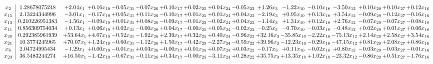 \documentclass[9pt]{article}
\begin{document}
 \[\begin{array}{c| c c@{\hskip 2pt} c@{\hskip 2pt} c@{\hskip 2pt} c@{\hskip 2pt} c@{\hskip 2pt} c@{\hskip 2pt} c@{\hskip 2pt} c@{\hskip 2pt} c@{\hskip 2pt} c@{\hskip 2pt} c@{\hskip 2pt} c@{\hskip 2pt} c@{\hskip 2pt} c@{\hskip 2pt} c@{\hskip 2pt} }
 x_{2}   &  1.28678075248 & +  2.04 x_{1} & +  0.16 x_{19} & -0.05 x_{31} & -0.07 x_{26} & +  0.10 x_{17} & +  0.02 x_{25} & +  0.04 x_{24} & -0.05 x_{22} & +  1.26 x_{3} & -1.22 x_{10} & -0.10 x_{18} & -3.50 x_{12} & +  0.10 x_{29} & +  0.10 x_{27} & +  0.12 x_{16}\\
 x_{15}   &  2.13224344996 & -3.01 x_{1} & -0.17 x_{19} & +  0.05 x_{31} & +  0.11 x_{26} & -0.10 x_{17} & +  0.01 x_{25} & +  0.01 x_{24} & +  0.04 x_{22} & -2.19 x_{3} & +  0.95 x_{10} & +  0.13 x_{18} & +  3.54 x_{12} & -0.09 x_{29} & -0.12 x_{27} & -0.16 x_{16}\\
 x_{13}   &  0.210226951383 & -1.56 x_{1} & -0.09 x_{19} & +  0.01 x_{31} & +  0.08 x_{26} & -0.09 x_{17} & -0.01 x_{25} & -0.02 x_{24} & +  0.04 x_{22} & -1.14 x_{3} & +  1.31 x_{10} & +  0.12 x_{18} & +  2.76 x_{12} & -0.07 x_{29} & -0.07 x_{27} & -0.08 x_{16}\\
 x_{11}   &  0.856309754034 & +  0.13 x_{1} & +  0.06 x_{19} & +  0.02 x_{31} & -0.00 x_{26} & +  0.04 x_{17} & -0.00 x_{25} & +  0.05 x_{24} & -0.02 x_{22} & -0.25 x_{3} & -0.70 x_{10} & -0.03 x_{18} & -0.48 x_{12} & +  0.02 x_{29} & +  0.01 x_{27} & +  0.06 x_{16}\\
 x_{20}   &  0.292385961939 & + 53.64 x_{1} & +  4.07 x_{19} & -0.52 x_{31} & -1.92 x_{26} & +  2.39 x_{17} & +  0.32 x_{25} & +  0.40 x_{24} & -0.96 x_{22} & + 32.16 x_{3} & -35.85 x_{10} & -2.22 x_{18} & -75.13 x_{12} & +  2.14 x_{29} & +  2.58 x_{27} & +  3.54 x_{16}\\
 x_{21}   &  10.3774245965 & + 70.07 x_{1} & +  1.24 x_{19} & -0.60 x_{31} & -1.12 x_{26} & +  1.50 x_{17} & -0.42 x_{25} & -2.27 x_{24} & -0.59 x_{22} & + 39.96 x_{3} & -12.23 x_{10} & -0.29 x_{18} & -47.15 x_{12} & +  0.81 x_{29} & +  2.08 x_{27} & +  0.86 x_{16}\\
 x_{8}   &  2.04724995434 & -1.29 x_{1} & +  0.00 x_{19} & -0.01 x_{31} & +  0.03 x_{26} & -0.00 x_{17} & +  0.01 x_{25} & +  0.07 x_{24} & +  0.03 x_{22} & -0.17 x_{3} & +  0.11 x_{10} & -0.02 x_{18} & +  0.80 x_{12} & -0.03 x_{29} & -0.03 x_{27} & -0.01 x_{16}\\
 x_{23}   &  36.5483244274 & + 16.50 x_{1} & -1.42 x_{19} & -0.67 x_{31} & -0.11 x_{26} & +  0.34 x_{17} & -0.00 x_{25} & -3.11 x_{24} & +  0.28 x_{22} & + 35.75 x_{3} & + 13.35 x_{10} & +  1.02 x_{18} & -23.32 x_{12} & -0.86 x_{29} & +  0.51 x_{27} & -1.76 x_{16}\\

\end{array}\]
\end{document}
